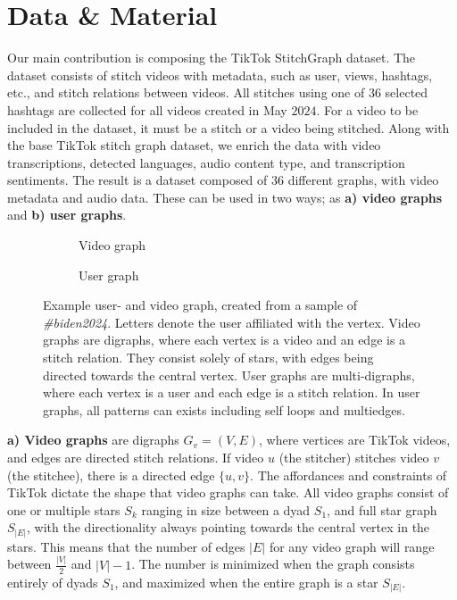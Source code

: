 \chapter{Data \& Material}

Our main contribution is composing the TikTok StitchGraph dataset. The dataset consists of stitch videos with metadata, such as user, views, hashtags, etc., and stitch relations between videos. All stitches using one of $36$ selected hashtags are collected for all videos created in May $2024$. For a video to be included in the dataset, it must be a stitch or a video being stitched. Along with the base TikTok stitch graph dataset, we enrich the data with video transcriptions, detected languages, audio content type, and transcription sentiments. The result is a dataset composed of $36$ different graphs, with video metadata and audio data. These can be used in two ways; as \textbf{a) video graphs} and \textbf{b) user graphs}. 


\begin{figure}[H]
    \centering
    \begin{subfigure}{0.5\textwidth}
        \centering
        
        \caption{Video graph}
        \label{fig:biden_vgraph}
    \end{subfigure}%
    \begin{subfigure}{0.5\textwidth}
        \centering
        
        \caption{User graph}
        \label{fig:biden_ugraph}
    \end{subfigure}
    \caption{Example user- and video graph, created from a sample of \textit{\#biden2024}. Letters denote the user affiliated with the vertex. Video graphs are digraphs, where each vertex is a video and an edge is a stitch relation. They consist solely of stars, with edges being directed towards the central vertex. User graphs are multi-digraphs, where each vertex is a user and each edge is a stitch relation. In user graphs, all patterns can exists including self loops and multiedges.}
    \label{fig:biden}
\end{figure}

\textbf{a) Video graphs} are digraphs $G_v=(V,E)$, where vertices are TikTok videos, and edges are directed stitch relations. If video $u$ (the stitcher) stitches video $v$ (the stitchee), there is a directed edge $\{u, v\}$. The affordances and constraints of TikTok dictate the shape that video graphs can take. All video graphs consist of one or multiple stars $S_k$ ranging in size between a dyad $S_1$, and full star graph $S_{|E|}$, with the directionality always pointing towards the central vertex in the stars. This means that the number of edges $|E|$ for any video graph will range between $\frac{|V|}{2}$ and $|V| - 1$. The number is minimized when the graph consists entirely of dyads $S_1$, and maximized when the entire graph is a star $S_{|E|}$.

